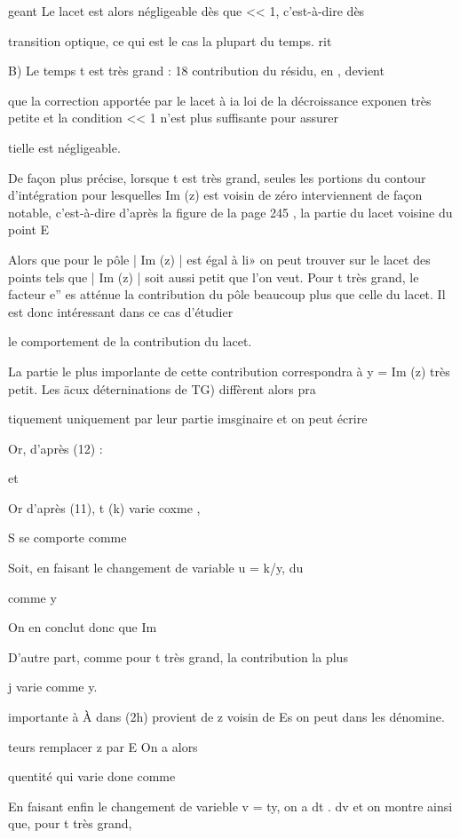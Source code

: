 geant Le lacet est alors négligeable dès que << 1, c'est-à-dire dès

transition optique, ce qui est le cas la plupart du temps. rit

B) Le temps t est très grand : 18 contribution du résidu, en , devient

que la correction apportée par le lacet à ia loi de la décroissance exponen
très petite et la condition << 1 n'est plus suffisante pour assurer

tielle est négligeable.

De façon plus précise, lorsque t est très grand, seules les portions du contour d'intégration pour lesquelles Im (z) est voisin de zéro interviennent de façon notable, c'est-à-dire d'après la figure de la page 245 ,
la partie du lacet voisine du point E

Alors que pour le pôle  | Im (z) | est égal à li» on peut
trouver sur le lacet des points tels que | Im (z) | soit aussi petit que l'on
veut. Pour t très grand, le facteur e” es atténue la contribution du pôle
beaucoup plus que celle du lacet. Il est donc intéressant dans ce cas d'étudier

le comportement de la contribution du lacet.

La partie le plus imporlante de cette contribution correspondra
à y = Im (z) très petit. Les äcux déterninations de TG) diffèrent alors pra

tiquement uniquement par leur partie imsginaire et on peut écrire

Or, d'après (12) :

et

Or d'après (11), t (k) varie coxme ,

S se comporte comme



Soit, en faisant le changement de variable u = k/y,
du

comme y

On en conclut donc que Im

D'autre part, comme pour t très grand, la contribution la plus

 j varie comme y.

importante à À dans (2h) provient de z voisin de Es on peut dans les dénomine.

teurs remplacer z par E On a alors

quentité qui varie done comme


En faisant enfin le changement de varieble v = ty, on a
 dt  .
 dv et on montre ainsi que, pour t très grand,

